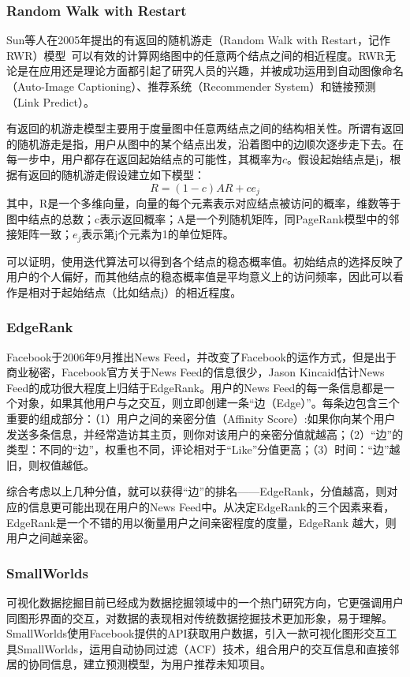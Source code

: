 \subsubsection{Random Walk with Restart}
Sun等人在2005年提出的有返回的随机游走（Random Walk with Restart，记作RWR）模型~\cite{sun2005neighborhood}可以有效的计算网络图中的任意两个结点之间的相近程度。RWR无论是在应用还是理论方面都引起了研究人员的兴趣，并被成功运用到自动图像命名（Auto-Image Captioning）、推荐系统（Recommender System）和链接预测（Link Predict）\cite{fujiwara2012fast}。

有返回的机游走模型主要用于度量图中任意两结点之间的结构相关性。所谓有返回的随机游走是指，用户从图中的某个结点出发，沿着图中的边顺次逐步走下去。在每一步中，用户都存在返回起始结点的可能性，其概率为$c$。假设起始结点是j，根据有返回的随机游走假设建立如下模型：
\begin{equation}\label{eq:rwr}
R=(1-c)AR + ce_j
\end{equation}
其中，R是一个多维向量，向量的每个元素表示对应结点被访问的概率，维数等于图中结点的总数；c表示返回概率；A是一个列随机矩阵，同PageRank模型中的邻接矩阵一致；$e_j$表示第j个元素为1的单位矩阵。

可以证明，使用迭代算法可以得到各个结点的稳态概率值。初始结点的选择反映了用户的个人偏好，而其他结点的稳态概率值是平均意义上的访问频率，因此可以看作是相对于起始结点（比如结点j）的相近程度。

\subsubsection{EdgeRank}
Facebook于2006年9月推出News Feed，并改变了Facebook的运作方式，但是出于商业秘密，Facebook官方关于News Feed的信息很少，Jason Kincaid估计News Feed的成功很大程度上归结于EdgeRank。用户的News Feed的每一条信息都是一个对象，如果其他用户与之交互，则立即创建一条“边（Edge）”。每条边包含三个重要的组成部分：（1）用户之间的亲密分值（Affinity Score）:如果你向某个用户发送多条信息，并经常造访其主页，则你对该用户的亲密分值就越高；（2）“边”的类型：不同的“边”，权重也不同，评论相对于“Like”分值更高；（3）时间：“边”越旧，则权值越低。

综合考虑以上几种分值，就可以获得“边”的排名——EdgeRank，分值越高，则对应的信息更可能出现在用户的News Feed中。从决定EdgeRank的三个因素来看，EdgeRank是一个不错的用以衡量用户之间亲密程度的度量，EdgeRank 越大，则用户之间越亲密。

\subsubsection{SmallWorlds}
可视化数据挖掘目前已经成为数据挖掘领域中的一个热门研究方向，它更强调用户同图形界面的交互，对数据的表现相对传统数据挖掘技术更加形象，易于理解。SmallWorlds使用Facebook提供的API获取用户数据，引入一款可视化图形交互工具SmallWorlds，运用自动协同过滤（ACF）技术，组合用户的交互信息和直接邻居的协同信息，建立预测模型，为用户推荐未知项目。

